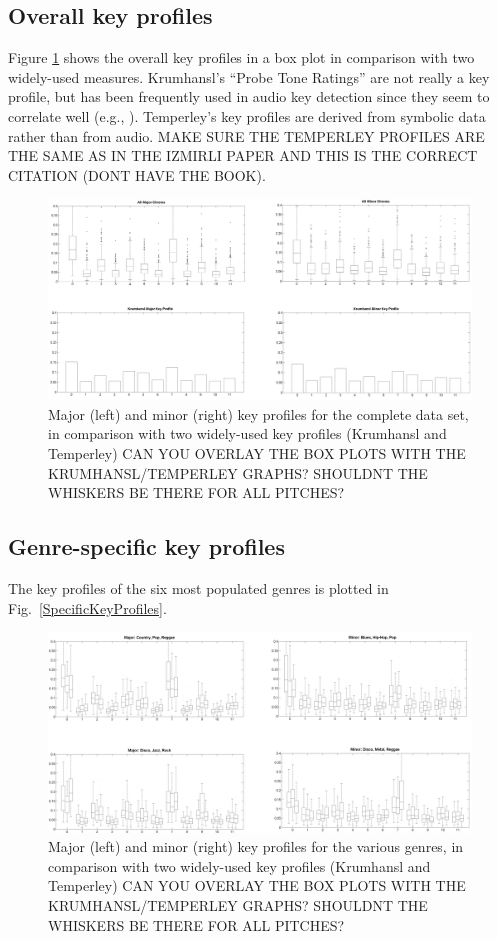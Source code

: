\documentclass{article}
\begin{document}
\subsection{Overall key profiles}
Figure \ref{fig:OverallKeyProfiles} shows the overall key profiles in a box plot in comparison with two widely-used measures. Krumhansl's ``Probe Tone Ratings'' \cite{krumhansl_cognitive_1990} are not really a key profile, but has been frequently used in audio key detection since they seem to correlate well (e.g., \cite{izmirli_template_2005}). Temperley's key profiles \cite{temperley_tonal_2007} are derived from symbolic data rather than from audio. MAKE SURE THE TEMPERLEY PROFILES ARE THE SAME AS IN THE IZMIRLI PAPER AND THIS IS THE CORRECT CITATION (DONT HAVE THE BOOK).
\begin{figure}[tb]
    \includegraphics[scale=.4]{graph/overall_boxplot}
	\caption{Major (left) and minor (right) key profiles for the complete data set, in comparison with two widely-used key profiles (Krumhansl and Temperley) CAN YOU OVERLAY THE BOX PLOTS WITH THE KRUMHANSL/TEMPERLEY GRAPHS? SHOULDNT THE WHISKERS BE THERE FOR ALL PITCHES?}
	\label{fig:OverallKeyProfiles}
\end{figure}

\subsection{Genre-specific key profiles}
The key profiles of the six most populated genres is plotted in Fig.~\ref{SpecificKeyProfiles}.
\begin{figure}[tb]
    \includegraphics[scale=.4]{graph/specific_boxplot}
	\caption{Major (left) and minor (right) key profiles for the various genres, in comparison with two widely-used key profiles (Krumhansl and Temperley) CAN YOU OVERLAY THE BOX PLOTS WITH THE KRUMHANSL/TEMPERLEY GRAPHS? SHOULDNT THE WHISKERS BE THERE FOR ALL PITCHES?}
	\label{fig:SpecificKeyProfiles}
\end{figure}
\end{document}
